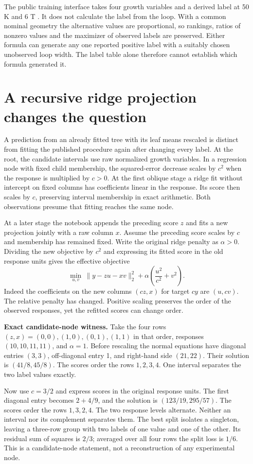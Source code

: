 \documentclass[11pt]{article}
\begin{document}
The public training interface takes four growth variables and a derived label at 50 K and 6 T \cite{code}. It does not calculate the label from the loop. With a common nominal geometry the alternative values are proportional, so rankings, ratios of nonzero values and the maximizer of observed labels are preserved. Either formula can generate any one reported positive label with a suitably chosen unobserved loop width. The label table alone therefore cannot establish which formula generated it.
\newpage
\section{A recursive ridge projection changes the question}
A prediction from an already fitted tree with its leaf means rescaled is distinct from fitting the published procedure again after changing every label. At the root, the candidate intervals use raw normalized growth variables. In a regression node with fixed child membership, the squared-error decrease scales by $c^2$ when the response is multiplied by $c>0$. At the first oblique stage a ridge fit without intercept on fixed columns has coefficients linear in the response. Its score then scales by $c$, preserving interval membership in exact arithmetic. Both observations presume that fitting reaches the same node.

At a later stage the notebook appends the preceding score $z$ and fits a new projection jointly with a raw column $x$. Assume the preceding score scales by $c$ and membership has remained fixed. Write the original ridge penalty as $\alpha>0$. Dividing the new objective by $c^2$ and expressing its fitted score in the old response units gives the effective objective
\[
 \min_{u,v}\ \|y-zu-xv\|_2^2+
 \alpha\left(\frac{u^2}{c^2}+v^2\right).
\]
Indeed the coefficients on the new columns $(cz,x)$ for target $cy$ are $(u,cv)$. The relative penalty has changed. Positive scaling preserves the order of the observed responses, yet the refitted scores can change order.

\textbf{Exact candidate-node witness.} Take the four rows $(z,x)=(0,0),(1,0),(0,1),(1,1)$ in that order, responses $(10,10,11,11)$, and $\alpha=1$. Before rescaling the normal equations have diagonal entries $(3,3)$, off-diagonal entry 1, and right-hand side $(21,22)$. Their solution is $(41/8,45/8)$. The scores order the rows $1,2,3,4$. One interval separates the two label values exactly.

Now use $c=3/2$ and express scores in the original response units. The first diagonal entry becomes $2+4/9$, and the solution is $(123/19,295/57)$. The scores order the rows $1,3,2,4$. The two response levels alternate. Neither an interval nor its complement separates them. The best split isolates a singleton, leaving a three-row group with two labels of one value and one of the other. Its residual sum of squares is $2/3$; averaged over all four rows the split loss is $1/6$. This is a candidate-node statement, not a reconstruction of any experimental node.
\end{document}
